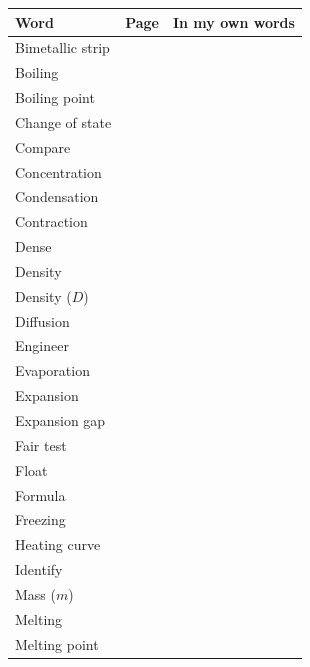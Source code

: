 \documentclass[11pt,a5paper,twoside]{article}
\begin{document}
\begin{longtable}{|>{\RaggedRight}p{34mm}|p{9mm}|p{\dimexpr\linewidth-43mm-6\tabcolsep-4\arrayrulewidth-1pt\relax}|}
\hline \rule{0pt}{4mm}\headingfont\bfseries Word & \headingfont\bfseries Page & \headingfont\bfseries In my own words \\ \hline \endhead
  Bimetallic strip & \pageref{voc:bimetallic-strip} & \\ \hline
  Boiling & \pageref{voc:boiling} & \\ \hline
  Boiling point & \pageref{voc:boiling-point} & \\ \hline
  Change of state & \pageref{voc:change-of-state} & \\ \hline
  Compare & \pageref{voc:compare} & \\ \hline
  Concentration & \pageref{voc:concentration} & \\ \hline
  Condensation & \pageref{voc:condensation} & \\ \hline
  Contraction & \pageref{voc:contraction} & \\ \hline
  Dense & \pageref{voc:dense} & \\ \hline
  Density & \pageref{voc:density} & \\ \hline
  Density ($D$) & \pageref{voc:density-d} & \\ \hline
  Diffusion & \pageref{voc:diffusion} & \\ \hline
  Engineer & \pageref{voc:engineer} & \\ \hline
  Evaporation & \pageref{voc:evaporation} & \\ \hline
  Expansion & \pageref{voc:expansion} & \\ \hline
  Expansion gap & \pageref{voc:expansion-gap} & \\ \hline
  Fair test & \pageref{voc:fair-test} & \\ \hline
  Float & \pageref{voc:float} & \\ \hline
  Formula & \pageref{voc:formula} & \\ \hline
  Freezing & \pageref{voc:freezing} & \\ \hline
  Heating curve & \pageref{voc:heating-curve} & \\ \hline
  Identify & \pageref{voc:identify} & \\ \hline
  Mass ($m$) & \pageref{voc:mass-m} & \\ \hline
  Melting & \pageref{voc:melting} & \\ \hline
  Melting point & \pageref{voc:melting-point} & \\ \hline

\end{longtable}
\end{document}
